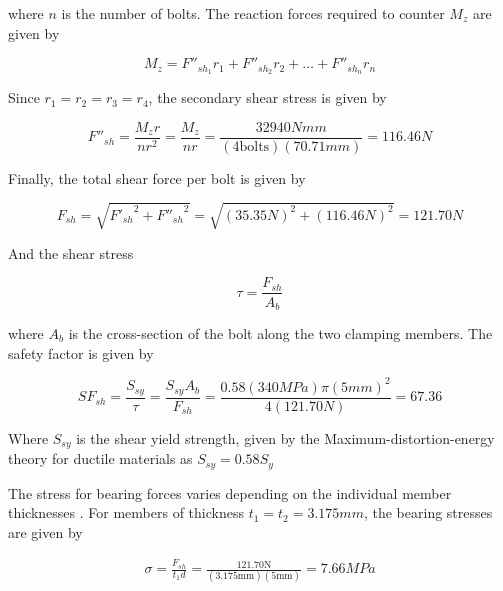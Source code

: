 where $n$ is the number of bolts.
The reaction forces required to counter $M_z$ are given by

\begin{equation}
    M_z = F''_{sh_1} r_1 + F''_{sh_2} r_2 + \dots +  F''_{sh_n} r_n
\end{equation}

Since $r_1 = r_2 = r_3 = r_4$, the secondary shear stress is given by \cite{budynas_shigleys_2015}

\begin{equation}{} \label{eq:bolt_shear_force_2}
    F''_{sh} = \frac{M_z r}{nr^2} = \frac{M_z}{nr} = \frac{32940Nmm}{(4\text{bolts})(70.71mm)} = 116.46N
\end{equation}

Finally, the total shear force per bolt is given by

\begin{equation} \label{eq:bolt_shear_force_total}
    F_{sh} = \sqrt{{F'_{sh}}^{2} + {F''_{sh}}^{2}} = \sqrt{(35.35N)^2 + (116.46N)^2} = 121.70N
\end{equation}

And the shear stress

\begin{equation} \label{eq:bolt_shear_stress}
    \tau = \frac{F_{sh}}{A_b}
\end{equation}{}

where $A_b$ is the cross-section of the bolt along the two clamping members.
The safety factor is given by

\begin{equation} \label{eq:(SF)_bolt}
    {SF}_{sh} = \frac{S_{sy}}{\tau} = \frac{S_{sy} A_b}{F_{sh}} = \frac{0.58(340MPa)\pi(5mm)^2}{4 (121.70N)} = 67.36
\end{equation}{}

Where $S_{sy}$ is the shear yield strength, given by the Maximum-distortion-energy theory for ductile materials as $S_{sy} = 0.58 S_y$ \cite{juvinall_fundamentals_2012}


The stress for bearing forces varies depending on the individual member thicknesses \cite{ahsan_mcg3131:_2018}.
For members of thickness $t_1 = t_2 = 3.175mm$, the bearing stresses are given by

\begin{gather}
    \sigma = \frac{F_{sh}}{t_1 d} = \frac{121.70\text{N}}{(3.175\text{mm})(5\text{mm})} = 7.66MPa
\end{gather}{}

